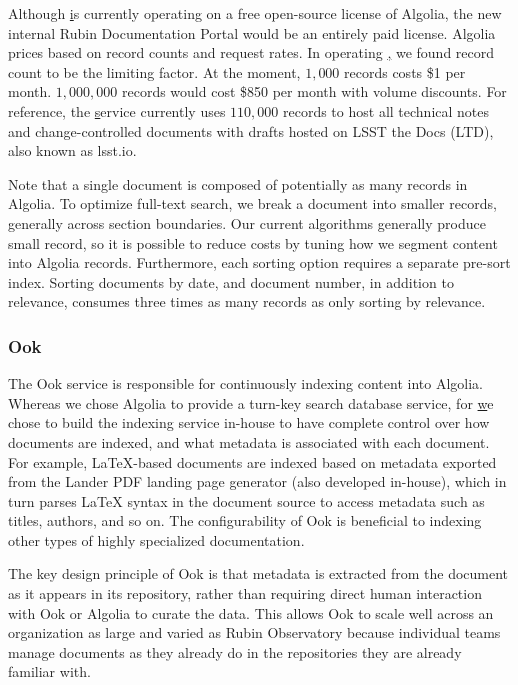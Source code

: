 Although \href{www.lsst.io} is currently operating on a free open-source license of Algolia, the new internal Rubin Documentation Portal would be an entirely paid license.
Algolia prices based on record counts and request rates.
In operating \href{www.lsst.io}, we found record count to be the limiting factor.
At the moment, $1,000$ records costs \$1 per month.
$1,000,000$ records would cost \$850 per month with volume discounts.
For reference, the \href{www.lsst.io} service currently uses $110,000$ records to host all technical notes and change-controlled documents with drafts hosted on LSST the Docs (LTD), also known as lsst.io.

Note that a single document is composed of potentially as many records in Algolia.
To optimize full-text search, we break a document into smaller records, generally across section boundaries.
Our current algorithms generally produce small record, so it is possible to reduce costs by tuning how we segment content into Algolia records.
Furthermore, each sorting option requires a separate pre-sort index.
Sorting documents by date, and document number, in addition to relevance, consumes three times as many records as only sorting by relevance.

\subsubsection{Ook}

The Ook service is responsible for continuously indexing content into Algolia. \citep{ook-cite}
Whereas we chose Algolia to provide a turn-key search database service, for \href{www.lsst.io} we chose to build the indexing service in-house to have complete control over how documents are indexed, and what metadata is associated with each document.
For example, LaTeX-based documents are indexed based on metadata exported from the Lander PDF landing page generator (also developed in-house), which in turn parses LaTeX syntax in the document source to access metadata such as titles, authors, and so on.
The configurability of Ook is beneficial to indexing other types of highly specialized documentation.

The key design principle of Ook is that metadata is extracted from the document as it appears in its repository, rather than requiring direct human interaction with Ook or Algolia to curate the data.
This allows Ook to scale well across an organization as large and varied as Rubin Observatory because individual teams manage documents as they already do in the repositories they are already familiar with.


